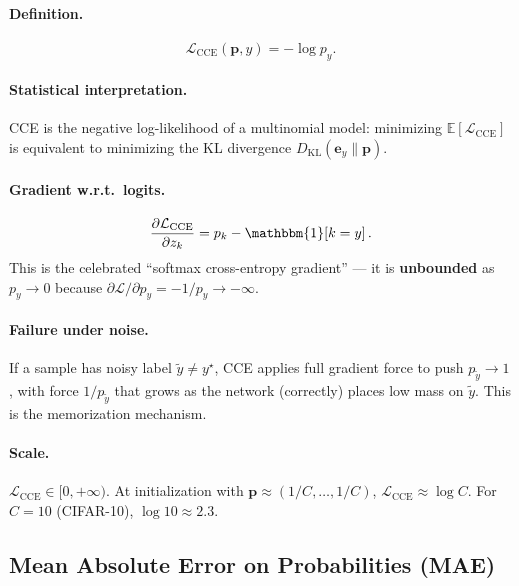 \documentclass[11pt,a4paper]{article}
\newcommand{\E}{\mathbb{E}}
\newcommand{\Lcal}{\mathcal{L}}
\newcommand{\ind}[1]{\mathbbm{1}\!\left[#1\right]}
\newcommand{\py}{p_y}
\newcommand{\pb}{\mathbf{p}}
\newcommand{\eb}{\mathbf{e}}
\begin{document}
\paragraph{Definition.}
\begin{equation}
  \label{eq:cce}
  \Lcal_{\mathrm{CCE}}(\pb, y) = -\log \py.
\end{equation}

\paragraph{Statistical interpretation.}
CCE is the negative log-likelihood of a multinomial model:
minimizing $\E[\Lcal_{\mathrm{CCE}}]$ is equivalent to minimizing
the KL divergence $D_{\mathrm{KL}}(\eb_y \| \pb)$.

\paragraph{Gradient w.r.t.\ logits.}
\begin{equation}
  \label{eq:cce_grad}
  \frac{\partial \Lcal_{\mathrm{CCE}}}{\partial z_k}
  = p_k - \ind{k=y}.
\end{equation}
This is the celebrated ``softmax cross-entropy gradient'' — it is \textbf{unbounded}
as $p_y \to 0$ because $\partial \Lcal/\partial p_y = -1/p_y \to -\infty$.

\paragraph{Failure under noise.}
If a sample has noisy label $\tilde{y} \neq y^\star$, CCE applies full gradient force
to push $p_{\tilde y} \to 1$, with force $1/p_{\tilde y}$ that grows as the network
(correctly) places low mass on $\tilde y$. This is the memorization mechanism.

\paragraph{Scale.}
$\Lcal_{\mathrm{CCE}} \in [0, +\infty)$. At initialization with $\pb \approx (1/C,\ldots,1/C)$,
$\Lcal_{\mathrm{CCE}} \approx \log C$. For $C=10$ (CIFAR-10), $\log 10 \approx 2.3$.

\subsection{Mean Absolute Error on Probabilities (MAE)}
\label{sec:mae}
\end{document}
